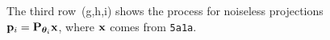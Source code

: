 \begin{figure}[t]
{        The third row~(g,h,i) shows the process for noiseless projections $\mathbf{p}_i = \mathbf{P}_{{\boldsymbol{\theta}}_i} \mathbf{x}$, where $\mathbf{x}$ comes from \texttt{5a1a}.
    }
\end{figure}



